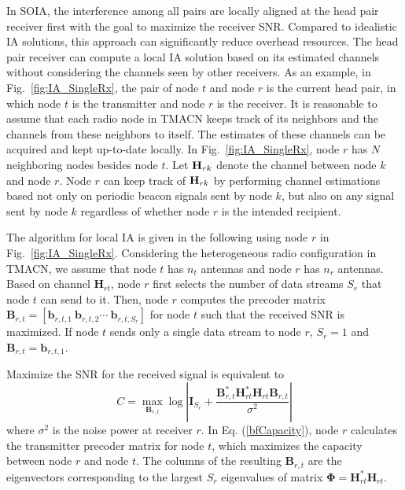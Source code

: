 \documentclass[letterpaper,11pt]{article}
\let\bs\boldsymbol
\begin{document}
In SOIA, the interference among all pairs are locally aligned at the head pair receiver first with the goal to maximize the receiver SNR. Compared to idealistic IA solutions, this approach can significantly reduce overhead resources. The head pair receiver can compute a local IA solution based on its estimated channels without considering the channels seen by other receivers. As an example, in Fig.~\ref{fig:IA_SingleRx}, the pair of node $t$ and node $r$ is the current head pair, in which node $t$ is the transmitter and node $r$ is the receiver. It is reasonable to assume that each radio node in TMACN keeps track of its neighbors and the channels from these neighbors to itself. The estimates of these channels can be acquired and kept up-to-date locally. In Fig.~\ref{fig:IA_SingleRx},  node $r$ has $N$ neighboring nodes besides node $t$. Let ${\bf{H}}_{rk}$ denote the channel between node $k$ and node $r$. Node $r$ can keep track of ${\bf{H}}_{rk}$ by performing channel estimations based not only on periodic beacon signals sent by node $k$, but also on any signal sent by node $k$ regardless of whether node $r$ is the intended recipient. 

The algorithm for local IA is given in the following using node $r$ in Fig.~\ref{fig:IA_SingleRx}. Considering the heterogeneous radio configuration in TMACN, we assume that node $t$ has $n_t$ antennas and node $r$ has $n_r$ antennas. Based on channel $\mathbf{H}_{rt}$, node $r$ first selects the number of data streams $S_r$ that node $t$ can send to it. Then, node $r$ computes the precoder matrix $\mathbf{B}_{r,t}=[\bs{b}_{r,t,1}~\bs{b}_{r,t,2}\cdots~\bs{b}_{r,t,S_r}]$ for node $t$ such that the received SNR is maximized. If node $t$ sends only a single data stream to node $r$, $S_r=1$ and $\mathbf{B}_{r,t}=\bs{b}_{r,t,1}$.

Maximize the SNR for the received signal is equivalent to
\begin{equation}\label{bfCapacity}
C=\displaystyle\max_{{\mathbf{B}}_{r,t}}\log\left|\mathbf{I}_{S_r}+\frac{\mathbf{B}_{r,t}^{*}\mathbf{H}_{rt}^{*}\mathbf{H}_{rt}\mathbf{B}_{r,t}}{\sigma^2}\right|
\end{equation}
where $\sigma^2$ is the noise power at receiver $r$. In Eq. (\ref{bfCapacity}), node $r$ calculates the transmitter precoder matrix for node $t$, which maximizes the capacity between node $r$ and node $t$. The columns of the resulting $\mathbf{B}_{r,t}$ are the eigenvectors corresponding to the largest $S_r$ eigenvalues of matrix $\boldsymbol{\Phi}=\mathbf{H}_{rt}^{*}\mathbf{H}_{rt}$.
\end{document}
